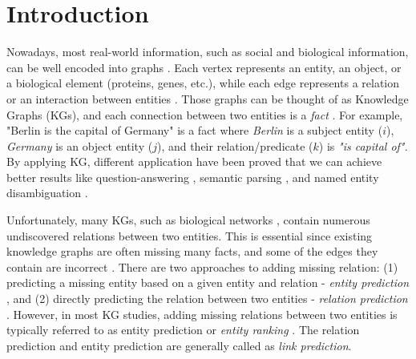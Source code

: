 \chapter{Introduction}
\label{cha:intro}
Nowadays, most real-world information, such as social and biological information, can be well encoded into graphs \citep{lu2011link}. Each vertex represents an entity, an object, or a biological element (proteins, genes, etc.), while each edge represents a relation or an interaction between entities \citep{chang2020benchmark}. Those graphs can be thought of as Knowledge Graphs (KGs), and each connection between two entities is a \textit{fact} \citep{2016}. For example, "Berlin is the capital of Germany" is a fact where \textit{Berlin} is a subject entity ($i$), \textit{Germany} is an object entity ($j$), and their relation/predicate ($k$) is \textit{"is capital of".} By applying KG, different application have been proved that we can achieve better results like question-answering \citep{bordes2014question, bordes2014open}, semantic parsing \citep{berant2013semantic, heck2013leveraging}, and named entity disambiguation \citep{Damljanovic2012NamedED, 38389}.

Unfortunately, many KGs, such as biological networks \citep{amaral2008truer, stumpf2008estimating, yu2008high}, contain numerous undiscovered relations between two entities. This is essential since existing knowledge graphs are often missing many facts, and some of the edges they contain are incorrect \citep{angeli2013philosophers}. There are two approaches to adding missing relation: (1) predicting a missing entity based on a given entity and relation - \textit{entity prediction} \citep{wang2017knowledge}, and (2) directly predicting the relation between two entities - \textit{relation prediction} \citep{lin2015modeling, xie2016representation}. However, in most KG studies, adding missing relations between two entities is typically referred to as entity prediction or \textit{entity ranking} \citep{lin2015modeling}. The relation prediction and entity prediction are generally called as \textit{link prediction}.

